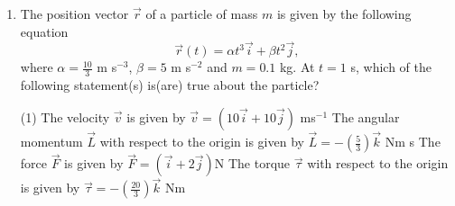 
\begin{enumerate}
    \item The position vector \(\vec{r}\) of a particle of mass \(m\) is given by the following equation \[\vec{r}(t) = \alpha t^3 \vec{i} + \beta t^2 \vec{j},\] where \(\alpha=\frac{10}{3}\) m s\(^{-3}\), \(\beta = 5\) m s\(^{-2}\) and \(m=0.1\) kg. At \(t=1\) s, which of the following statement(s) is(are) true about the particle?
        \begin{tasks}(1)
            \task The velocity \(\vec{v}\) is given by \(\vec{v} = (10\vec{i} + 10\vec{j})\) ms\(^{-1}\)
            \task The angular momentum \(\vec{L}\) with respect to the origin is given by \(\vec{L} = -\left(\frac{5}{3}\right) \vec{k}\) Nm s
            \task The force \(\vec{F}\) is given by \(\vec{F} = (\vec{i} + 2\vec{j})\)N
            \task The torque \(\vec{\tau}\) with respect to the origin is given by \(\vec{\tau} = -\left(\frac{20}{3}\right) \vec{k}\) Nm
        \end{tasks}
\end{enumerate}
